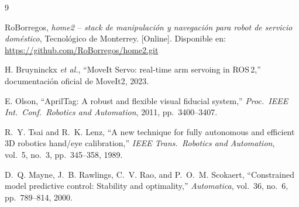 \documentclass[conference]{IEEEtran}
\begin{document}
\begin{thebibliography}{9}

RoBorregos, \emph{home2 -- stack de manipulaci\'on y navegaci\'on para
robot de servicio dom\'estico}, Tecnol\'ogico de Monterrey.
[Online]. Disponible en:
\url{https://github.com/RoBorregos/home2.git}

H. Bruyninckx \emph{et al.}, ``MoveIt Servo: real-time arm servoing in
ROS\,2,'' documentaci\'on oficial de MoveIt2, 2023.

E. Olson, ``AprilTag: A robust and flexible visual fiducial system,''
\emph{Proc.\ IEEE Int.\ Conf.\ Robotics and Automation}, 2011,
pp.~3400--3407.

R.~Y. Tsai and R.~K. Lenz, ``A new technique for fully autonomous and
efficient 3D robotics hand/eye calibration,''
\emph{IEEE Trans.\ Robotics and Automation}, vol.~5, no.~3,
pp.~345--358, 1989.

D.~Q. Mayne, J.~B. Rawlings, C.~V. Rao, and P.~O.~M. Scokaert,
``Constrained model predictive control: Stability and optimality,''
\emph{Automatica}, vol.~36, no.~6, pp.~789--814, 2000.

\end{thebibliography}
\end{document}
